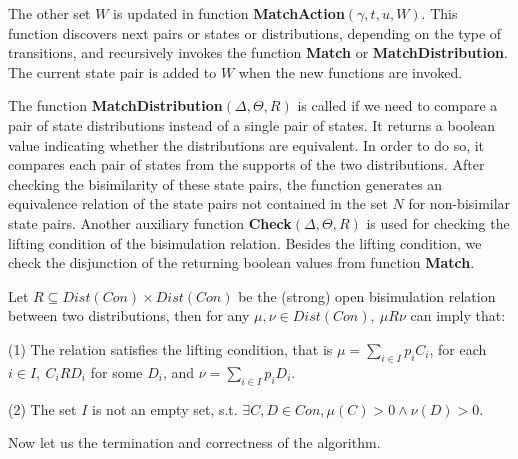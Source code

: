 \documentclass[a4paper,UKenglish,cleveref, autoref]{lipics-v2019}
\begin{document}
The other set $W$ is updated in function \textbf{MatchAction}$(\gamma,t,u,W)$. This function discovers next pairs or states or distributions, depending on the type of transitions,  and recursively invokes the function \textbf{Match} or \textbf{MatchDistribution}. The current state pair is added to $W$ when the new functions are invoked.


The function \textbf{MatchDistribution}$(\Delta,\Theta,\textit{R})$ is called if we need to compare a pair of state distributions instead of a single pair of states. It returns a boolean value indicating whether the distributions are equivalent. In order to do so, it compares each pair of states from the supports of the two distributions. After checking the bisimilarity of these state pairs, the function generates an equivalence relation of the state pairs not contained in the set $N$ for non-bisimilar state pairs. Another auxiliary function \textbf{Check}$(\Delta,\Theta,\textit{R})$ is used for checking the lifting condition of the bisimulation relation. Besides the lifting condition, we check the disjunction of the returning boolean values from function \textbf{Match}. 

\begin{definition}

Let $\textit{R}\subseteq Dist(Con)\times Dist(Con)$ be the (strong) open bisimulation relation between two distributions, then for any $\mu,\nu\in Dist(Con),\ \mu\textit{R}\nu$ can imply that:
\begin{item}
\item[(1)] The relation satisfies the lifting condition, that is $\mu=\sum_{i\in I}p_i\textit{C}_i$, for each $i\in I,\ \textit{C}_i\textit{R}\textit{D}_i$ for some $\textit{D}_i$, and $\nu=\sum_{i\in I}p_i\textit{D}_i$.
\item[(2)] The set $I$ is not an empty set, s.t. $\exists C,D\in Con, \mu(C)>0\wedge\nu(D)>0$.
\end{item}
\end{definition}

Now let us the termination and correctness of the algorithm. 
\end{document}
